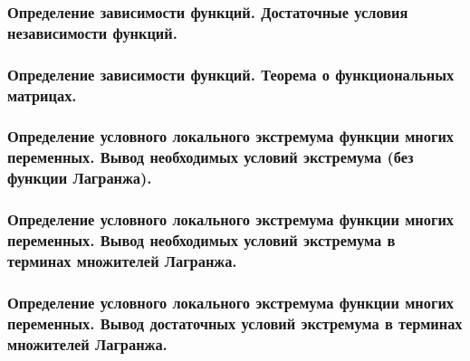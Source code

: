 \documentclass[10pt]{article}
\begin{document}
    \subsubsection{Определение зависимости функций. Достаточные условия независимости функций.}
    \subsubsection{Определение зависимости функций. Теорема о функциональных матрицах.}
    \subsubsection{Определение условного локального экстремума функции многих переменных. Вывод необходимых условий экстремума (без функции Лагранжа).}
    \subsubsection{Определение условного локального экстремума функции многих переменных. Вывод необходимых условий экстремума в терминах множителей Лагранжа.}
    \subsubsection{Определение условного локального экстремума функции многих переменных. Вывод достаточных условий экстремума в терминах множителей Лагранжа.}
\end{document}
